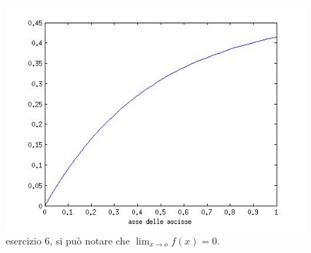 \begin{enumerate}
\begin{svol}
\begin{figure}[!ht]\begin{center}
\includegraphics[scale=.50]{fig/es4-6.jpg}\end{center}
\caption{esercizio $6$, si può notare che $\displaystyle \lim_{x \to o}f(x)=0$.}
\end{figure}

\end{svol}
\end{enumerate}
